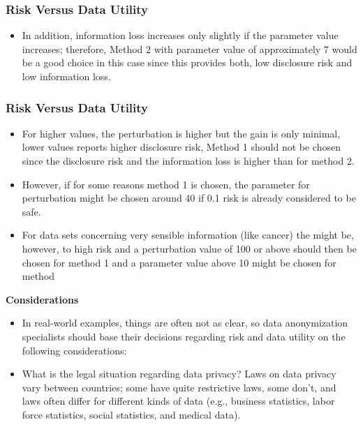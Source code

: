 \documentclass{beamer}
\begin{document}
\begin{frame}
	\frametitle{Risk Versus Data Utility}
	\begin{itemize}
		\item In addition, information loss increases only slightly if the parameter
		value increases; therefore, Method 2 with parameter value of approximately 7
		would be a good choice in this case since this provides both, low disclosure risk
		and low information loss. 
	\end{itemize}
\end{frame}
\begin{frame}
	\frametitle{Risk Versus Data Utility}
	\begin{itemize}
		\item For higher values, the perturbation is higher but the
		gain is only minimal, lower values reports higher disclosure risk, Method 1 should
		not be chosen since the disclosure risk and the information loss is higher than for
		method 2. \item However, if for some reasons method 1 is chosen, the parameter for
		perturbation might be chosen around 40 if 0.1 risk is already considered to be
		safe. 
		\item For data sets concerning very sensible information (like cancer) the might
		be, however, to high risk and a perturbation value of 100 or above should then be
		chosen for method 1 and a parameter value above 10 might be chosen for method
	\end{itemize}
\end{frame}
\begin{frame}
	\textbf{Considerations}
	\begin{itemize}
		\item In real-world examples, things are often not as clear, so data anonymization specialists should base their decisions regarding risk and data utility on the following
		considerations:
		
		\item What is the legal situation regarding data privacy? Laws on data privacy vary
		between countries; some have quite restrictive laws, some don’t, and laws often
		differ for different kinds of data (e.g., business statistics, labor force statistics,
		social statistics, and medical data).
		
	\end{itemize}
\end{frame}
\end{document}
